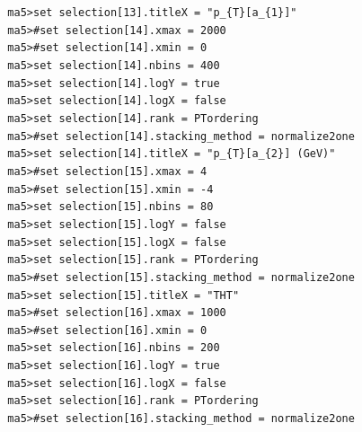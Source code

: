 \documentclass[a4paper, 10pt]{article}
\begin{document}
\texttt{ }\texttt{ }\texttt{ma5>set selection[13].titleX = "p\_\{T\}[a\_\{1\}]"\\
}
\texttt{ }\texttt{ }\texttt{ma5>\#set selection[14].xmax = 2000\\
}
\texttt{ }\texttt{ }\texttt{ma5>\#set selection[14].xmin = 0\\
}
\texttt{ }\texttt{ }\texttt{ma5>set selection[14].nbins = 400\\
}
\texttt{ }\texttt{ }\texttt{ma5>set selection[14].logY = true\\
}
\texttt{ }\texttt{ }\texttt{ma5>set selection[14].logX = false\\
}
\texttt{ }\texttt{ }\texttt{ma5>set selection[14].rank = PTordering\\
}
\texttt{ }\texttt{ }\texttt{ma5>\#set selection[14].stacking\_method = normalize2one\\
}
\texttt{ }\texttt{ }\texttt{ma5>set selection[14].titleX = "p\_\{T\}[a\_\{2\}] (GeV)"\\
}
\texttt{ }\texttt{ }\texttt{ma5>\#set selection[15].xmax = 4\\
}
\texttt{ }\texttt{ }\texttt{ma5>\#set selection[15].xmin = -4\\
}
\texttt{ }\texttt{ }\texttt{ma5>set selection[15].nbins = 80\\
}
\texttt{ }\texttt{ }\texttt{ma5>set selection[15].logY = false\\
}
\texttt{ }\texttt{ }\texttt{ma5>set selection[15].logX = false\\
}
\texttt{ }\texttt{ }\texttt{ma5>set selection[15].rank = PTordering\\
}
\texttt{ }\texttt{ }\texttt{ma5>\#set selection[15].stacking\_method = normalize2one\\
}
\texttt{ }\texttt{ }\texttt{ma5>set selection[15].titleX = "THT"\\
}
\texttt{ }\texttt{ }\texttt{ma5>\#set selection[16].xmax = 1000\\
}
\texttt{ }\texttt{ }\texttt{ma5>\#set selection[16].xmin = 0\\
}
\texttt{ }\texttt{ }\texttt{ma5>set selection[16].nbins = 200\\
}
\texttt{ }\texttt{ }\texttt{ma5>set selection[16].logY = true\\
}
\texttt{ }\texttt{ }\texttt{ma5>set selection[16].logX = false\\
}
\texttt{ }\texttt{ }\texttt{ma5>set selection[16].rank = PTordering\\
}
\texttt{ }\texttt{ }\texttt{ma5>\#set selection[16].stacking\_method = normalize2one\\
}
\end{document}
